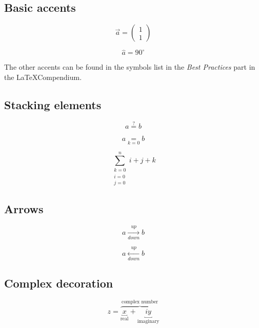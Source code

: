 \documentclass{article}
\begin{document}
\subsection*{Basic accents}

\[
	\vec{a} =
	\begin{pmatrix}
		1\\
		1
	\end{pmatrix}
\]

\[
\hat{a} = 90^\circ
\]

The other accents can be found in the symbols list in the \emph{Best Practices} part in the \LaTeX Compendium.

\subsection*{Stacking elements}

\[
	a \overset{?}{=} b
\]

\[
	a \underset{k = 0}{=} b
\]

\[
	\sum_{\substack{k=0 \\ i=0 \\ j=0}}^{n} i + j + k
\]

\subsection*{Arrows}

\[
	a \xrightarrow[down]{up} b
\]

\[
	a \xleftarrow[down]{up} b
\]

\subsection*{Complex decoration}

\[
	z = \overbrace{\underbracket{x}_{\text{real}} + \underbracket{iy}_{\text{imaginary}}}^{\text{complex number}}
\]
\end{document}
